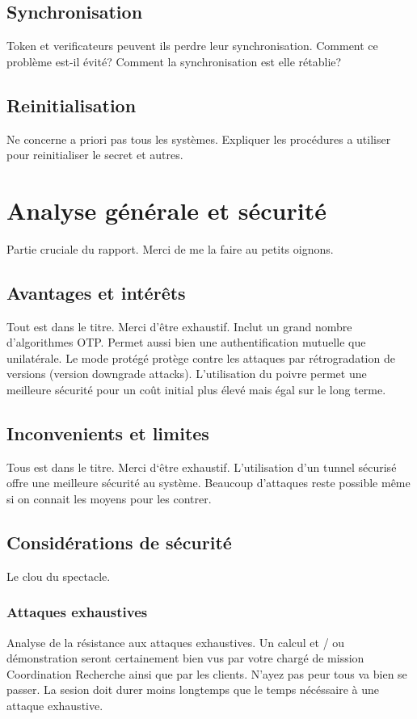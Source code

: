 \documentclass{../res/univ-projet}
\begin{document}
  \subsection{Synchronisation}
  Token et verificateurs peuvent ils perdre leur synchronisation. Comment ce problème est-il évité? Comment la synchronisation est elle rétablie?
  
  \subsection{Reinitialisation}
  Ne concerne a priori pas tous les systèmes. Expliquer les procédures a utiliser pour reinitialiser le secret et autres.
  
\section{Analyse générale et sécurité}
Partie cruciale du rapport. Merci de me la faire au petits oignons.

  \subsection{Avantages et intér\^ets}
  Tout est dans le titre. Merci d'\^etre exhaustif.
  Inclut un grand nombre d'algorithmes OTP.
  Permet aussi bien une authentification mutuelle que unilatérale.
  Le mode protégé protège contre les attaques par rétrogradation de versions (version downgrade attacks).
  L'utilisation du poivre permet une meilleure sécurité pour un coût initial plus élevé mais égal sur le long terme.
  
  \subsection{Inconvenients et limites}
  Tous est dans le titre. Merci d`\^etre exhaustif.
  L'utilisation d'un tunnel sécurisé offre une meilleure sécurité au système.
  Beaucoup d'attaques reste possible même si on connait les moyens pour les contrer.
  
  \subsection{Considérations de sécurité}
  Le clou du spectacle.
    \subsubsection{Attaques exhaustives}
    Analyse de la résistance aux attaques exhaustives. Un calcul et / ou démonstration seront certainement bien vus par votre chargé de mission
    \og{}Coordination Recherche\fg{} ainsi que par les clients. N'ayez pas peur tous va bien se passer.
    La sesion doit durer moins longtemps que le temps nécéssaire à une attaque exhaustive.
    
\end{document}
